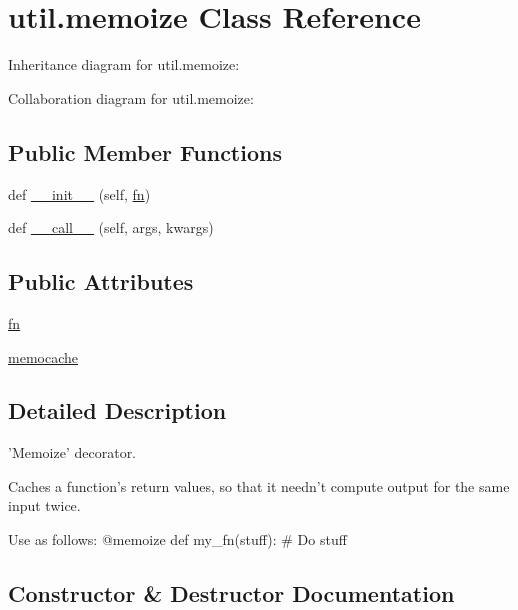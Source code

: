 \hypertarget{classutil_1_1memoize}{}\section{util.\+memoize Class Reference}
\label{classutil_1_1memoize}


Inheritance diagram for util.\+memoize\+:


Collaboration diagram for util.\+memoize\+:
\subsection*{Public Member Functions}
\begin{DoxyCompactItemize}
\item 
def \hyperlink{classutil_1_1memoize_a01ed8330b56635e481a0476e3286e9d8}{\+\_\+\+\_\+init\+\_\+\+\_\+} (self, \hyperlink{classutil_1_1memoize_ace92fa4b2e85f909610224ecfe2dde19}{fn})
\item 
def \hyperlink{classutil_1_1memoize_a2fb9d2b784bfbfd5878bbbe5a4e51432}{\+\_\+\+\_\+call\+\_\+\+\_\+} (self, args, kwargs)
\end{DoxyCompactItemize}
\subsection*{Public Attributes}
\begin{DoxyCompactItemize}
\item 
\hyperlink{classutil_1_1memoize_ace92fa4b2e85f909610224ecfe2dde19}{fn}
\item 
\hyperlink{classutil_1_1memoize_a403e0fd68392e06f99df667a511f11df}{memocache}
\end{DoxyCompactItemize}


\subsection{Detailed Description}
\begin{DoxyVerb}'Memoize' decorator.

Caches a function's return values,
so that it needn't compute output for the same input twice.

Use as follows:
@memoize
def my_fn(stuff):
    # Do stuff
\end{DoxyVerb}
 

\subsection{Constructor \& Destructor Documentation}
\hypertarget{classutil_1_1memoize_a01ed8330b56635e481a0476e3286e9d8}{}
